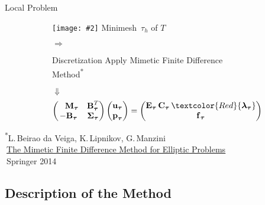 \documentclass[svgnames]{beamer} %
\newcommand{\includegraphicsw}[2][1.]{\texttt{[image: \#2]}}
\newcommand{\vect}[1]{\boldsymbol{\mathbf{#1}}}
\newcommand{\mmesh}{{\vect{\mathcal \tau}}}
\begin{document}
\begin{frame}{Local Problem}
\begin{overlayarea}{\textwidth}{5cm}
{\begin{figure}
\begin{subfigure}{.3\linewidth}
					\includegraphicsw[.9]{ring_mini_voronoi_cell.png}
					Minimesh~$\mmesh_h$ of $T$
				\end{subfigure}%
				\begin{subfigure}{.1\linewidth}\centering
					\vskip -1.65cm
					$\Rightarrow\:\,$
				\end{subfigure}%
				\begin{subfigure}{.6\linewidth}\centering
					\begin{block}{Discretization}\centering
						Apply Mimetic Finite Difference\\Method\textsuperscript{*}
					\end{block}
					$\Downarrow$
					\begin{equation*}
						\begin{pmatrix}
							\phantom{-}\vect M_\mmesh & \vect B^T_\mmesh \\
							-\vect B_\mmesh & \vect \Sigma_\mmesh            
							\end{pmatrix} 
							\begin{pmatrix}
							\vect u_\mmesh \\
							\vect p_\mmesh        
						\end{pmatrix}
						= 
						\begin{pmatrix}
							\vect E_\mmesh\,\vect C_\mmesh\,\textcolor{Red}{\vect \lambda_\mmesh} \\
							\vect f_\mmesh        
						\end{pmatrix}
					\end{equation*}		
				\end{subfigure}%
			\end{figure}
			\setul{1pt}{.4pt} %
			\tiny{
				\textsuperscript{*}L.\,Beirao da Veiga, K.\,Lipnikov, G.\,Manzini\\
				$\:$\href{https://www.springer.com/us/book/9783319026626}{\ul{The Mimetic Finite Difference Method for Elliptic Problems}}\\
				$\:$Springer 2014
			}
		}
		\end{overlayarea}	
	\end{frame}

	\subsection{Description of the Method}
	
\end{document}
